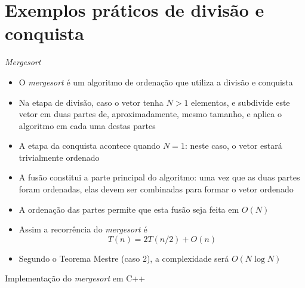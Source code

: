 \section{Exemplos práticos de divisão e conquista}

\begin{frame}[fragile]{\it Mergesort}

    \begin{itemize}
        \item O \textit{mergesort} é um algoritmo de ordenação que utiliza a divisão e conquista

        \item Na etapa de divisão, caso o vetor tenha $N > 1$ elementos, e subdivide este vetor
            em duas partes de, aproximadamente, mesmo tamanho, e aplica o algoritmo em cada
            uma destas partes

        \item A etapa da conquista acontece quando $N = 1$: neste caso, o vetor estará trivialmente
            ordenado

        \item A fusão constitui a parte principal do algoritmo: uma vez que as duas partes foram
            ordenadas, elas devem ser combinadas para formar o vetor ordenado

        \item A ordenação das partes permite que esta fusão seja feita em $O(N)$

        \item Assim a recorrência do \textit{mergesort} é
        \[
            T(n) = 2T(n/2) + O(n)
        \]

        \item Segundo o Teorema Mestre (caso 2), a complexidade será $O(N\log N)$
    \end{itemize}

\end{frame}

\begin{frame}[fragile]{Implementação do {\it mergesort} em C++}
\end{frame}

